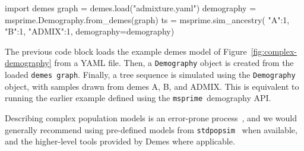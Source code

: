 \documentclass[graybox]{svmult}
\newcommand{\msprime}[0]{\texttt{msprime}}
\begin{document}
\begin{pythoncode}
import demes
graph = demes.load("admixture.yaml")
demography = msprime.Demography.from_demes(graph)
ts = msprime.sim_ancestry(
    {"A":1, "B":1, "ADMIX":1},
    demography=demography)
\end{pythoncode}

The previous code block loads the example demes model of
Figure~\ref{fig:complex-demography} from a YAML file. Then, a \texttt{Demography} object
is created from the loaded \texttt{demes graph}. Finally, a tree sequence is simulated using the
\texttt{Demography} object, with samples drawn from demes A, B, and ADMIX. This is
equivalent to running the earlier example defined using the \msprime\
demography API.

Describing complex population models is an error-prone
process~\citep{ragsdale2020lessons}, and we would generally recommend using
pre-defined models from \texttt{stdpopsim}~\citep{
adrion2020stdpopsim,lauterbur2023expanding,gower2025accessible} when available,
and the higher-level tools provided by Demes where applicable.



\end{document}
